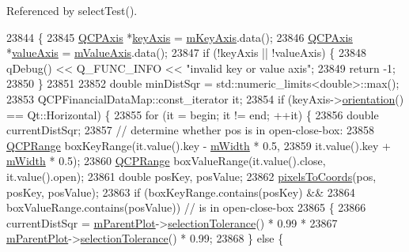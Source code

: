 Referenced by select\+Test().


\begin{DoxyCode}
23844                                                         \{
23845   \hyperlink{class_q_c_p_axis}{QCPAxis} *\hyperlink{class_q_c_p_abstract_plottable_a72c7a09c22963f2c943f07112b311103}{keyAxis} = \hyperlink{class_q_c_p_abstract_plottable_a426f42e254d0f8ce5436a868c61a6827}{mKeyAxis}.data();
23846   \hyperlink{class_q_c_p_axis}{QCPAxis} *\hyperlink{class_q_c_p_abstract_plottable_a3106f9d34d330a6097a8ec5905e5b519}{valueAxis} = \hyperlink{class_q_c_p_abstract_plottable_a2901452ca4aea911a1827717934a4bda}{mValueAxis}.data();
23847   \textcolor{keywordflow}{if} (!keyAxis || !valueAxis) \{
23848     qDebug() << Q\_FUNC\_INFO << \textcolor{stringliteral}{"invalid key or value axis"};
23849     \textcolor{keywordflow}{return} -1;
23850   \}
23851 
23852   \textcolor{keywordtype}{double} minDistSqr = std::numeric\_limits<double>::max();
23853   QCPFinancialDataMap::const\_iterator it;
23854   \textcolor{keywordflow}{if} (keyAxis->\hyperlink{class_q_c_p_axis_a57483f2f60145ddc9e63f3af53959265}{orientation}() == Qt::Horizontal) \{
23855     \textcolor{keywordflow}{for} (it = begin; it != end; ++it) \{
23856       \textcolor{keywordtype}{double} currentDistSqr;
23857       \textcolor{comment}{// determine whether pos is in open-close-box:}
23858       \hyperlink{class_q_c_p_range}{QCPRange} boxKeyRange(it.value().key - \hyperlink{class_q_c_p_financial_af630e5eb8485146b9c777e63fd1cf993}{mWidth} * 0.5,
23859                            it.value().key + \hyperlink{class_q_c_p_financial_af630e5eb8485146b9c777e63fd1cf993}{mWidth} * 0.5);
23860       \hyperlink{class_q_c_p_range}{QCPRange} boxValueRange(it.value().close, it.value().open);
23861       \textcolor{keywordtype}{double} posKey, posValue;
23862       \hyperlink{class_q_c_p_abstract_plottable_a10408828446e9e0681c46d65120f382e}{pixelsToCoords}(pos, posKey, posValue);
23863       \textcolor{keywordflow}{if} (boxKeyRange.contains(posKey) &&
23864           boxValueRange.contains(posValue)) \textcolor{comment}{// is in open-close-box}
23865       \{
23866         currentDistSqr = \hyperlink{class_q_c_p_layerable_aa2a528433e44db02b8aef23c1f9f90ed}{mParentPlot}->\hyperlink{class_q_custom_plot_a7b738074c75e80070ef6a10263c6cd69}{selectionTolerance}() * 0.99 *
23867                          \hyperlink{class_q_c_p_layerable_aa2a528433e44db02b8aef23c1f9f90ed}{mParentPlot}->\hyperlink{class_q_custom_plot_a7b738074c75e80070ef6a10263c6cd69}{selectionTolerance}() * 0.99;
23868       \} \textcolor{keywordflow}{else} \{

\end{DoxyCode}
